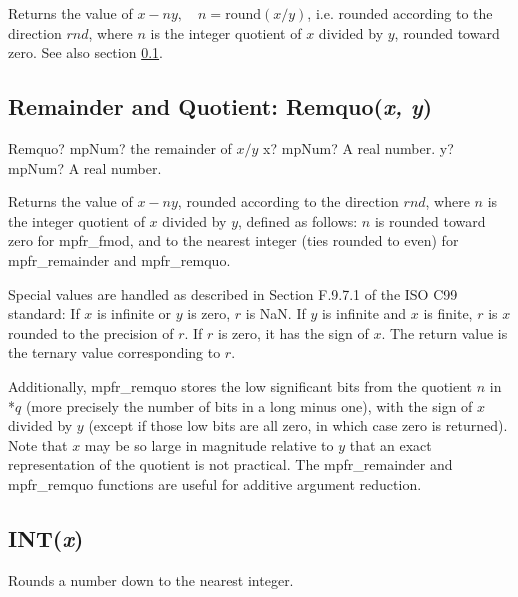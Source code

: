 \vspace{0.3cm}
Returns the value of $x-ny, \quad n=\text{round}(x/y)$, i.e. rounded according to the direction $rnd$, where $n$ is the integer quotient of $x$ divided by $y$,  rounded toward zero.
See also section \ref{Remquo}.




\subsection{Remainder and Quotient: Remquo(\textit{x, y})}
\label{Remquo}

\begin{mpFunctionsExtract}
	\mpFunctionTwo
	{Remquo? mpNum? the remainder of $x/y$}
	{x? mpNum? A real number.}
	{y? mpNum? A real number.}
\end{mpFunctionsExtract}

\vspace{0.3cm}
Returns the value of $x - ny$, rounded according to the direction $rnd$, where $n$ is the integer quotient of $x$ divided by $y$, defined as follows: $n$ is rounded toward zero for mpfr\_fmod, and to the nearest integer (ties rounded to even) for mpfr\_remainder and mpfr\_remquo.

\vspace{0.3cm}
Special values are handled as described in Section F.9.7.1 of the ISO C99 standard: If $x$ is infinite or $y$ is zero, $r$ is NaN. If $y$ is infinite and $x$ is finite, $r$ is $x$ rounded to the precision of $r$. If $r$ is zero, it has the sign of $x$. The return value is the ternary value corresponding to $r$.

\vspace{0.3cm}
Additionally, mpfr\_remquo stores the low significant bits from the quotient $n$ in *$q$ (more precisely the number of bits in a long minus one), with the sign of $x$ divided by $y$ (except if those low bits are all zero, in which case zero is returned). Note that $x$ may be so large in magnitude relative to $y$ that an exact representation of the quotient is not practical. The mpfr\_remainder and mpfr\_remquo functions are useful for additive argument reduction.




\subsection{INT(\textit{x})}


\vspace{0.3cm}
Rounds a number down to the nearest integer.





